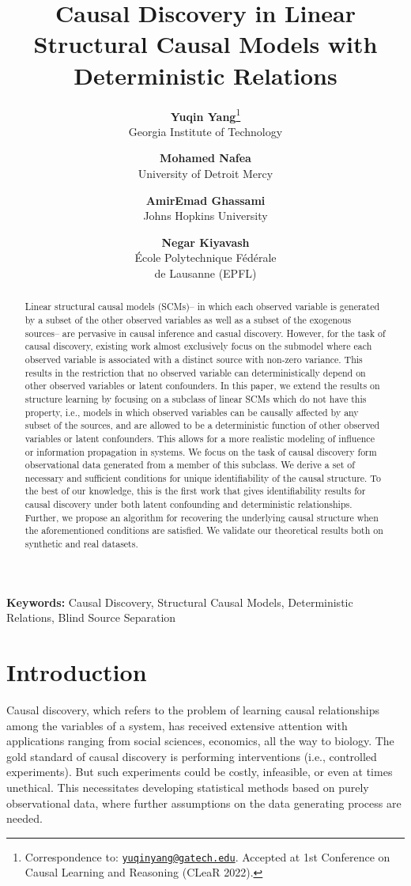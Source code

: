\documentclass[12pt]{article}
\title{\textbf{Causal Discovery in Linear Structural Causal Models with Deterministic Relations}}
\author{\normalsize \textbf{Yuqin Yang}\thanks{Correspondence to: \href{mailto:yuqinyang@gatech.edu}{\texttt{yuqinyang@gatech.edu}}. Accepted at 1st Conference on Causal Learning and Reasoning (CLeaR 2022).} 
\\ 
\normalsize Georgia Institute of
\normalsize Technology
\and  
\normalsize
\textbf{Mohamed Nafea} %
\\ 
\normalsize University of Detroit Mercy
\and
\normalsize
\textbf{AmirEmad Ghassami} %
\\ 
\normalsize Johns Hopkins University
\and 
\normalsize
\textbf{Negar Kiyavash} %
\\ \normalsize École Polytechnique Fédérale \\
\normalsize de Lausanne (EPFL)
}
\date{}
\providecommand{\keywords}[1]
{
  \small	
  \textbf{\textbf{Keywords:}} #1
}
\begin{document}
\maketitle

\begin{abstract}%
Linear structural causal models (SCMs)-- in which each observed variable is generated by a subset of the other observed variables as well as a subset of the exogenous sources-- are pervasive in causal inference and casual discovery. However, for the task of causal discovery, existing work almost exclusively focus on the submodel where each observed variable is associated with a distinct source with non-zero variance. This results in the restriction that no observed variable can deterministically depend on other observed variables or latent confounders. In this paper, we extend the results on structure learning by focusing on a subclass of linear SCMs which do not have this property, i.e., models in which observed variables can be causally affected by any subset of the sources, and are allowed to be a deterministic function of other observed variables or latent confounders. This allows for a more realistic modeling of influence or information propagation in systems. We focus on the task of causal discovery form observational data generated from a member of this subclass. We derive a set of necessary and sufficient conditions for unique identifiability of the causal structure. To the best of our knowledge, this is the first work that gives identifiability results for causal discovery under both latent confounding and deterministic relationships. Further, we propose an algorithm for recovering the underlying causal structure when the aforementioned conditions are satisfied. We validate our theoretical results both on synthetic and real datasets. 
\end{abstract}

\keywords{Causal Discovery, Structural Causal Models, Deterministic Relations, Blind Source Separation}%

\vspace{-3mm}
\section{Introduction} \label{sec:intro}
\vspace{-2mm}
Causal discovery, which refers to the problem of learning causal relationships among the variables of a system, has received extensive attention with applications ranging from social sciences, economics, all the way to biology. The gold standard of causal discovery is performing interventions (i.e., controlled experiments). But such experiments could be costly, infeasible, or even at times unethical. This necessitates developing statistical methods based on purely observational data, where further assumptions on the data generating process are needed.
\end{document}
